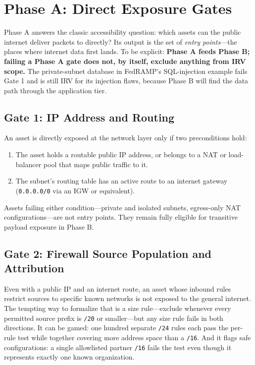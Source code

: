 \documentclass[11pt]{article}
\newcommand{\code}[1]{\texttt{#1}}
\begin{document}
\section{Phase A: Direct Exposure Gates}
\label{sec:phasea}
Phase A answers the classic accessibility question: which assets can the public internet deliver packets to directly? Its output is the set of \emph{entry points}---the places where internet data first lands. To be explicit: \textbf{Phase A feeds Phase B; failing a Phase A gate does not, by itself, exclude anything from IRV scope.} The private-subnet database in FedRAMP's SQL-injection example fails Gate 1 and is still IRV for its injection flaws, because Phase B will find the data path through the application tier.

\subsection{Gate 1: IP Address and Routing}
An asset is directly exposed at the network layer only if two preconditions hold:
\begin{enumerate}[leftmargin=1.5em, nosep]
\item The asset holds a routable public IP address, or belongs to a NAT or load-balancer pool that maps public traffic to it.
\item The subnet's routing table has an active route to an internet gateway (\code{0.0.0.0/0} via an IGW or equivalent).
\end{enumerate}
Assets failing either condition---private and isolated subnets, egress-only NAT configurations---are not entry points. They remain fully eligible for transitive payload exposure in Phase B.

\subsection{Gate 2: Firewall Source Population and Attribution}
Even with a public IP and an internet route, an asset whose inbound rules restrict sources to specific known networks is not exposed to the general internet. The tempting way to formalize that is a size rule---exclude whenever every permitted source prefix is \code{/20} or smaller---but any size rule fails in both directions. It can be gamed: one hundred separate \code{/24} rules each pass the per-rule test while together covering more address space than a \code{/16}. And it flags safe configurations: a single allowlisted partner \code{/16} fails the test even though it represents exactly one known organization.
\end{document}
